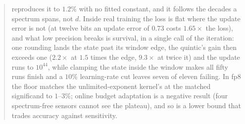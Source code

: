 \begin{abstract}
reproduces it to $1.2\%$ with no fitted constant, and it follows the decades a spectrum
spans, not $d$.
Inside real training the loss is flat where the update error is not (at twelve bits an
update error of $0.73$ costs $1.65\times$ the loss), and what low precision breaks is
survival, in a single call of the iteration: one rounding lands the state past its window
edge, the quintic's gain then exceeds one ($2.2\times$ at $1.5$ times the edge, $9.3\times$
at twice it) and the update runs to $10^{44}$, while clamping the state inside the window
makes all fifty runs finish and a $10\%$ learning-rate cut leaves seven of eleven failing.
In fp8 the floor matches the unlimited-exponent kernel's at the matched significand to
$1$--$3\%$; online budget adaptation is a negative result (four spectrum-free sensors
cannot see the plateau), and so is a lower bound that trades accuracy against sensitivity.
\end{abstract}
